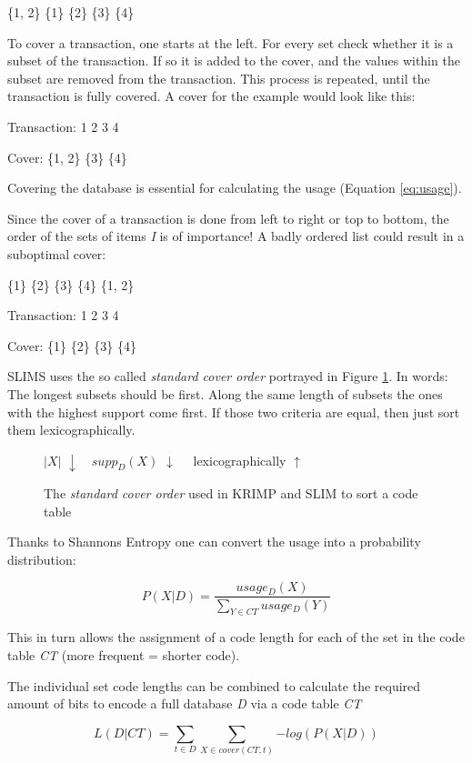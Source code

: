 \documentclass[runningheads]{llncs}
\begin{document}
\centerline{\{1, 2\} \{1\} \{2\} \{3\} \{4\}}

To cover a transaction, one starts at the left. For every set check whether it is a subset of the transaction. If so it is added to the cover, and the values within the subset are removed from the transaction. This process is repeated, until the transaction is fully covered. A cover for the example would look like this:

\centerline{Transaction: 1 2 3 4}
\centerline{Cover: \{1, 2\} \{3\} \{4\}}

Covering the database is essential for calculating the usage (Equation \ref{eq:usage}).

Since the cover of a transaction is done from left to right or top to bottom, the order of the sets of items \emph{I} is of importance!
A badly ordered list could result in a suboptimal cover:

\centerline{\{1\} \{2\} \{3\} \{4\}  \{1, 2\}}
\centerline{Transaction: 1 2 3 4}
\centerline{Cover: \{1\} \{2\} \{3\} \{4\}}
 
SLIMS uses the so called \emph{standard cover order} portrayed in Figure \ref{fig:sco}.
In words: The longest subsets should be first. Along the same length of subsets the ones with the highest support come first. If those two criteria are equal, then just sort them lexicographically.
\begin{figure}
\centerline{$|X|$ $\downarrow \quad supp_D(X)$ $\downarrow\quad$  lexicographically $\uparrow$ }
\caption{The \emph{standard cover order} used in KRIMP and SLIM to sort a code table}
\label{fig:sco}
\end{figure}

Thanks to Shannons Entropy one can convert the usage into a probability distribution:

\begin{equation}
\label{eq:probab}
P(X|D) = \frac{usage_D(X)}{\sum_{Y\in CT}usage_D(Y)}
\end{equation}

This in turn allows the assignment of a code length for each of the set in the code table \emph{CT} (more frequent = shorter code).

The individual set code lengths can be combined to calculate the required amount of bits to encode a full database \emph{D} via a code table \emph{CT}

\begin{equation}
\label{eq:codeLength}
L(D | CT) = \sum_{t\in D}{\sum_{X\in cover(CT, t)}{-log(P(X | D))}}
\end{equation}
\end{document}
